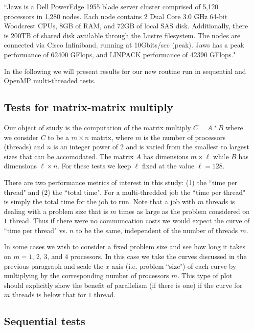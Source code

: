 \documentclass[aps,prl,twocolumn,groupedaddress,floatfix]{revtex4}
\begin{document}
``Jaws is a Dell PowerEdge 1955 blade server cluster comprised of 5,120 
processors in 1,280 nodes. Each node contains 2 Dual Core 3.0 GHz 64-bit 
Woodcrest CPUs, 8GB of RAM, and 72GB of local SAS disk.  Additionally, 
there is 200TB of shared disk available through the Lustre filesystem. The 
nodes are connected via Cisco Infiniband, running at 10Gbits/sec (peak).
Jaws has a peak performance of 62400 GFlops, and LINPACK performance of 
42390 GFlops."

In the following we will present results for our new routine run in 
sequential and OpenMP multi-threaded tests.

\subsection{Tests for matrix-matrix multiply}

Our object of study is the computation of the matrix multiply
$C = A*B$ where we consider $C$ to be a $m \times n$ matrix, where 
$m$ is the number of processors (threads) and $n$ is an integer power of 
$2$ and is varied from the smallest to largest sizes that can be accomodated.
The matrix $A$ has dimensions $m \times \ell$ while $B$ has dimensions
$\ell \times n$.  For these tests we keep $\ell$ fixed at the value
$\ell = 128$.

There are two performance metrics of interest in this study: (1) the 
``time per thread" and (2) the ``total time".  For a multi-thredded job
the ``time per thread" is simply the total time for the job to run.  Note
that a job with $m$ threads is dealing with a problem size that is $m$
times as large as the problem considered on $1$ thread.  Thus if there were
no communcation costs we would expect the curve of ``time per thread" vs.
$n$ to be the same, independent of the number of threads $m$.

In some cases we wish to consider a fixed problem size and see how long it
takes on $m = 1$, $2$, $3$, and $4$ processors.  In this case we take the 
curves discussed in the previous paragraph and scale the $x$ axis 
(i.e. problem ``size") of each curve by multiplying by the corresponding 
number of processors $m$.  This type of plot should explicitly show the 
benefit of parallelism (if there is one) if the curve for $m$ threads
is below that for $1$ thread.

\subsection{Sequential tests}
\end{document}
